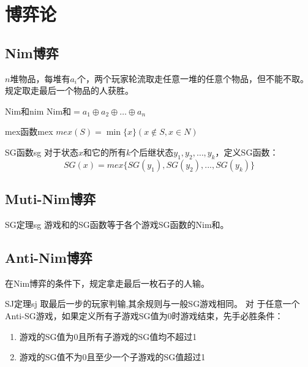 \section{博弈论}
\subsection{Nim博弈}
$n$堆物品，每堆有$a_i$个，两个玩家轮流取走任意一堆的任意个物品，但不能不取。规定取走最后一个物品的人获胜。\par
\begin{definition}{Nim和}{nim}
    Nim和$=a_1\oplus a_2\oplus \dots\oplus a_n$
\end{definition}
\begin{definition}{mex函数}{mex}
    $mex(S)=\min\{x\}(x\notin S,x\in N)$
\end{definition}
\begin{definition}{SG函数}{sg}
    对于状态$x$和它的所有$k$个后继状态$y_1,y_2,\dots,y_k$，定义SG函数：
    $$SG(x)=mex\{SG(y_1),SG(y_2),...,SG(y_k)\}$$
\end{definition}
\subsection{Muti-Nim博弈}
\begin{theorem}{SG定理}{sg}
    游戏和的SG函数等于各个游戏SG函数的Nim和。
\end{theorem}
\subsection{Anti-Nim博弈}
在Nim博弈的条件下，规定拿走最后一枚石子的人输。
\begin{theorem}{SJ定理}{sj}
取最后一步的玩家判输,其余规则与一般SG游戏相同。 对 于任意一个Anti-SG游戏，如果定义所有子游戏SG值为0时游戏结束，先手必胜条件：
\begin{enumerate}
    \item 游戏的SG值为0且所有子游戏的SG值均不超过1
    \item 游戏的SG值不为0且至少一个子游戏的SG值超过1
\end{enumerate}
\end{theorem}